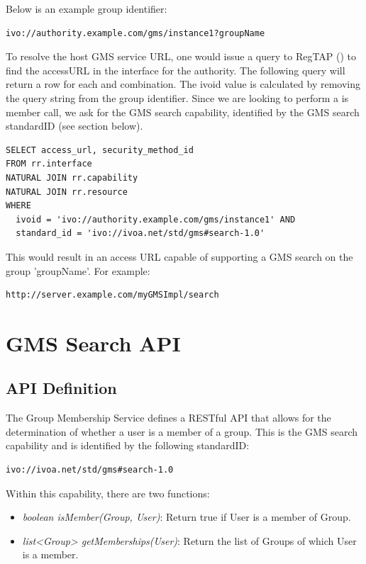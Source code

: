 \documentclass[11pt,a4paper]{ivoa}
\begin{document}
Below is an example group identifier:

\begin{verbatim}
ivo://authority.example.com/gms/instance1?groupName
\end{verbatim}

To resolve the host GMS service URL, one would issue a query to RegTAP (\citep{std:RegTAP}) to find the accessURL in the interface for the authority.  The following query will return a row for each  and  combination.  The ivoid value is calculated by removing the query string from the group identifier.  Since we are looking to perform a is member call, we ask for the GMS search capability, identified by the GMS search standardID (see section below).

\begin{verbatim}
SELECT access_url, security_method_id
FROM rr.interface
NATURAL JOIN rr.capability
NATURAL JOIN rr.resource
WHERE
  ivoid = 'ivo://authority.example.com/gms/instance1' AND
  standard_id = 'ivo://ivoa.net/std/gms#search-1.0'
\end{verbatim}

This would result in an access URL capable of supporting a GMS search on the group 'groupName'.  For example:

\begin{verbatim}
http://server.example.com/myGMSImpl/search
\end{verbatim}

\section{GMS Search API}

\subsection{API Definition}

The Group Membership Service defines a RESTful API \citep{fielding00} that allows for the determination of whether a user is a member of a group.  This is the GMS search capability and is identified by the following standardID:

\begin{verbatim}
ivo://ivoa.net/std/gms#search-1.0
\end{verbatim}

Within this capability, there are two functions:

\begin{itemize}
\item \emph{boolean isMember(Group, User)}: Return true if User is a member of Group.
\item \emph{list<Group> getMemberships(User)}: Return the list of Groups of which User is a member.
\end{itemize}
\end{document}

